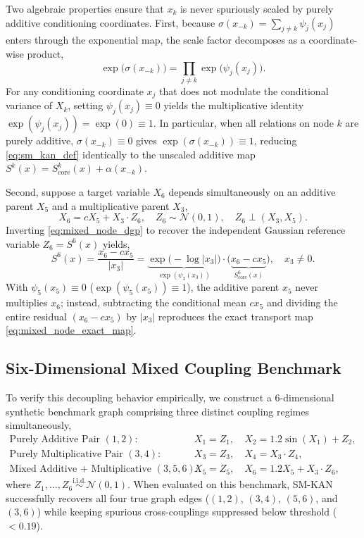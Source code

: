 Two algebraic properties ensure that $x_k$ is never spuriously scaled by purely additive conditioning coordinates. First, because $\sigma(x_{-k}) = \sum_{j \neq k} \psi_j(x_j)$ enters through the exponential map, the scale factor decomposes as a coordinate-wise product,
\begin{equation}
    \exp\big(\sigma(x_{-k})\big) = \prod_{j \neq k} \exp\big(\psi_j(x_j)\big).
\end{equation}
For any conditioning coordinate $x_j$ that does not modulate the conditional variance of $X_k$, setting $\psi_j(x_j) \equiv 0$ yields the multiplicative identity $\exp(\psi_j(x_j)) = \exp(0) \equiv 1$. In particular, when all relations on node $k$ are purely additive, $\sigma(x_{-k}) \equiv 0$ gives $\exp(\sigma(x_{-k})) \equiv 1$, reducing \eqref{eq:sm_kan_def} identically to the unscaled additive map $S^k(x) = S^k_{\text{core}}(x) + \alpha(x_{-k})$.

Second, suppose a target variable $X_6$ depends simultaneously on an additive parent $X_5$ and a multiplicative parent $X_3$,
\begin{equation}
    X_6 = c X_5 + X_3 \cdot Z_6, \quad Z_6 \sim \mathcal{N}(0, 1), \quad Z_6 \perp (X_3, X_5).
    \label{eq:mixed_node_dgp}
\end{equation}
Inverting \eqref{eq:mixed_node_dgp} to recover the independent Gaussian reference variable $Z_6 = S^6(x)$ yields,
\begin{equation}
    S^6(x) = \frac{x_6 - c x_5}{|x_3|} = \underbrace{\exp\big(-\log|x_3|\big)}_{\exp(\psi_3(x_3))} \cdot \big(\underbrace{x_6 - c x_5}_{S^6_{\text{core}}(x)}\big), \quad x_3 \neq 0.
    \label{eq:mixed_node_exact_map}
\end{equation}
With $\psi_5(x_5) \equiv 0$ ($\exp(\psi_5(x_5)) \equiv 1$), the additive parent $x_5$ never multiplies $x_6$; instead, subtracting the conditional mean $c x_5$ and dividing the entire residual $(x_6 - c x_5)$ by $|x_3|$ reproduces the exact transport map \eqref{eq:mixed_node_exact_map}.

\subsection{Six-Dimensional Mixed Coupling Benchmark}
\label{subsec:mixed_coupling_graph}

To verify this decoupling behavior empirically, we construct a 6-dimensional synthetic benchmark graph comprising three distinct coupling regimes simultaneously,
\begin{align}
    \text{Purely Additive Pair }(1, 2): &\quad X_1 = Z_1, \quad X_2 = 1.2\sin(X_1) + Z_2, \\
    \text{Purely Multiplicative Pair }(3, 4): &\quad X_3 = Z_3, \quad X_4 = X_3 \cdot Z_4, \\
    \text{Mixed Additive + Multiplicative }(3, 5, 6): &\quad X_5 = Z_5, \quad X_6 = 1.2 X_5 + X_3 \cdot Z_6,
\end{align}
where $Z_1, \dots, Z_6 \stackrel{\text{i.i.d.}}{\sim} \mathcal{N}(0, 1)$. When evaluated on this benchmark, SM-KAN successfully recovers all four true graph edges ($(1, 2)$, $(3, 4)$, $(5, 6)$, and $(3, 6)$) while keeping spurious cross-couplings suppressed below threshold ($< 0.19$).

